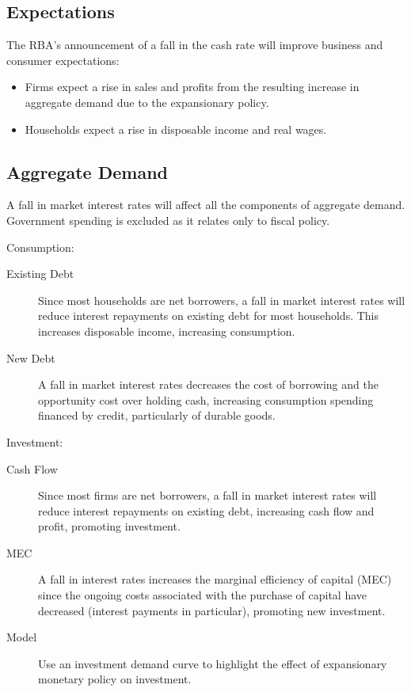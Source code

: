 \documentclass[a4paper,11pt]{report}
\begin{document}
\subsection{Expectations}

The RBA's announcement of a fall in the cash rate will improve business and
consumer expectations:

\begin{itemize}
\item Firms expect a rise in sales and profits from the resulting increase in
	aggregate demand due to the expansionary policy.
\item Households expect a rise in disposable income and real wages.
\end{itemize}

\subsection{Aggregate Demand}

A fall in market interest rates will affect all the components of aggregate
demand. Government spending is excluded as it relates only to fiscal policy.

Consumption:

\begin{description}
\item [Existing Debt] Since most households are net borrowers, a fall in
	market interest rates will reduce interest repayments on existing debt for
	most households. This increases disposable income, increasing consumption.
\item [New Debt] A fall in market interest rates decreases the cost of borrowing
	and the opportunity cost over holding cash, increasing consumption spending
	financed by credit, particularly of durable goods.
\end{description}

Investment:

\begin{description}
\item [Cash Flow] Since most firms are net borrowers, a fall in market interest
	rates will reduce interest repayments on existing debt, increasing cash
	flow and profit, promoting investment.
\item [MEC] A fall in interest rates increases the marginal efficiency of
	capital (MEC) since the ongoing costs associated with the purchase of
	capital have decreased (interest payments in particular), promoting new
	investment.
\item [Model] Use an investment demand curve to highlight the effect of
	expansionary monetary policy on investment.
\end{description}
\end{document}

